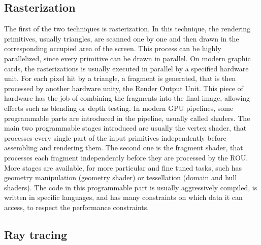 \subsection{Rasterization}
The first of the two techniques is rasterization. In this technique, the rendering primitives, usually triangles, are scanned one by one and then drawn in the corresponding occupied area of the screen. This process can be highly parallelized, since every primitive can be drawn in parallel. On modern graphic cards, the rasterizations is usually executed in parallel by a specified hardware unit. For each pixel hit by a triangle, a fragment is generated, that is then processed by another hardware unity, the Render Output Unit. This piece of hardware has the job of combining the fragments into the final image, allowing effects such as blending or depth testing. In modern GPU pipelines, some programmable parts are introduced in the pipeline, usually called shaders. The main two programmable stages introduced are usually the vertex shader, that processes every single part of the input primitives independently before assembling and rendering them. The second one is the fragment shader, that processes each fragment independently before they are processed by the ROU. More stages are available, for more particular and fine tuned tasks, such has geometry manipulation (geometry shader) or tessellation (domain and hull shaders). The code in this programmable part is usually aggressively compiled, is written in specific languages, and has many constraints on which data it can access, to respect the performance constraints. 


\subsection{Ray tracing}

